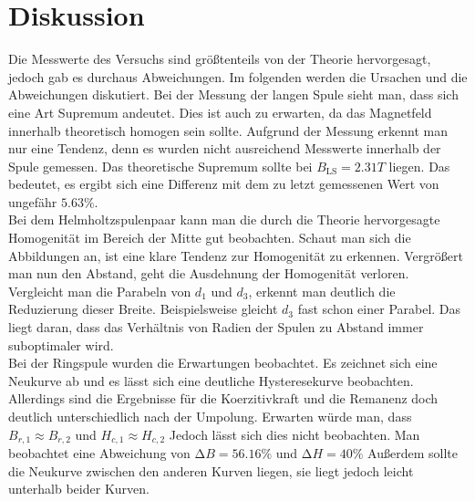\section{Diskussion}
\label{sec:Diskussion}

Die Messwerte des Versuchs sind größtenteils von der Theorie hervorgesagt, jedoch gab es durchaus Abweichungen.
Im folgenden werden die Ursachen und die Abweichungen diskutiert.
Bei der Messung der langen Spule sieht man, dass sich eine Art Supremum andeutet.
Dies ist auch zu erwarten, da das Magnetfeld innerhalb theoretisch homogen sein sollte.
Aufgrund der Messung erkennt man nur eine Tendenz, denn es wurden nicht ausreichend Messwerte innerhalb der Spule gemessen.
Das theoretische Supremum sollte bei $B_{\text{LS}} = 2.31T$ liegen.
Das bedeutet, es ergibt sich eine Differenz mit dem zu letzt gemessenen Wert von ungefähr $5.63\%$. \\

Bei dem Helmholtzspulenpaar kann man die durch die Theorie hervorgesagte Homogenität im Bereich der Mitte gut beobachten.
Schaut man sich die Abbildungen an, ist eine klare Tendenz zur Homogenität zu erkennen.
Vergrößert man nun den Abstand, geht die Ausdehnung der Homogenität verloren.
Vergleicht man die Parabeln von $d_{1}$ und $d_{3}$, erkennt man deutlich die Reduzierung dieser Breite.
Beispielsweise gleicht $d_{3}$ fast schon einer Parabel.
Das liegt daran, dass das Verhältnis von Radien der Spulen zu Abstand immer suboptimaler wird.  \\

Bei der Ringspule wurden die Erwartungen beobachtet.
Es zeichnet sich eine Neukurve ab und es lässt sich eine deutliche Hysteresekurve beobachten.
Allerdings sind die Ergebnisse für die Koerzitivkraft und die Remanenz doch deutlich unterschiedlich nach der Umpolung.
Erwarten würde man, dass $B_{r,1} \approx B_{r,2}$ und $H_{c,1} \approx H_{c,2}$
Jedoch lässt sich dies nicht beobachten. 
Man beobachtet eine Abweichung von $\increment B = 56.16 \%$ und  $\increment H = 40 \%$
Außerdem sollte die Neukurve zwischen den anderen Kurven liegen, sie liegt jedoch leicht unterhalb beider Kurven.

\nocite{matplotlib}